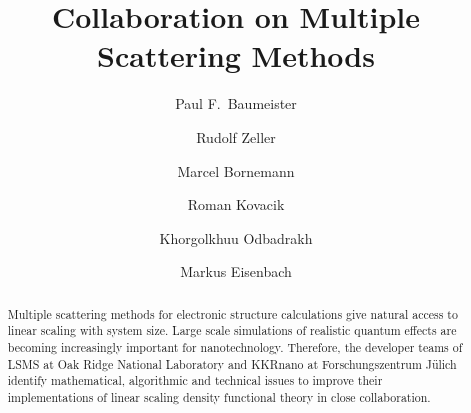 \documentclass{llncs}
\def\KKRnano{{KKRnano}}
\def\LSMS{{LSMS}}
\begin{document}
\title{Collaboration on Multiple Scattering Methods}

\author{ 
  Paul F.~Baumeister 
  \and
  Rudolf Zeller
  \and
  Marcel Bornemann
  \and
  Roman Kovacik
  \and
  Khorgolkhuu Odbadrakh
  \and
  Markus Eisenbach
}


\maketitle
\thispagestyle{firstpage}

\begin{abstract}
Multiple scattering methods for electronic structure calculations
give natural access to linear scaling with system size.
Large scale simulations of realistic quantum effects are becoming increasingly important
for nanotechnology. Therefore, the developer teams of \LSMS{} at Oak Ridge National Laboratory
and \KKRnano{} at Forschungszentrum J\"ulich identify mathematical, algorithmic and technical issues
to improve their implementations of linear scaling density functional theory in close collaboration.
\end{abstract}

\end{document}
